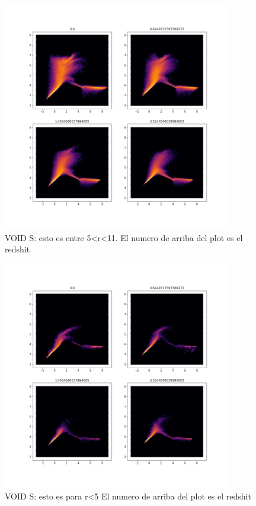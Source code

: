 \begin{figure}[h]
\centering
\includegraphics[width=10cm]{Figures/DF_wallS.png}
\decoRule
\caption[asd]{VOID S: esto es entre 5<r<11. El numero de arriba del plot es el redshit  }
\label{fig:Electron}
\end{figure}

\begin{figure}[h]
\centering
\includegraphics[width=10cm]{Figures/DF_inS.png}
\decoRule
\caption[asd]{VOID S: esto es para r<5  El numero de arriba del plot es el redshit    }
\label{fig:Electron}
\end{figure}

